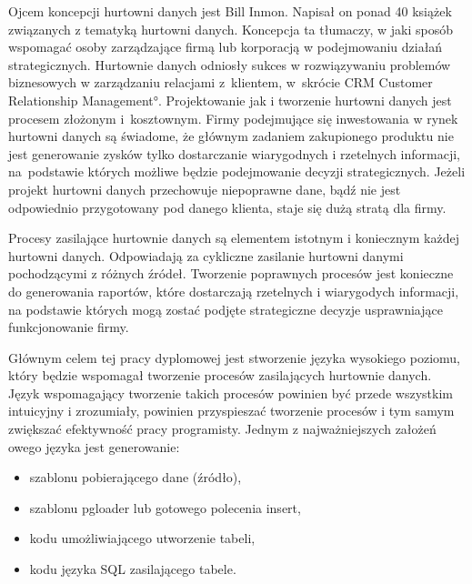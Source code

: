 Ojcem koncepcji hurtowni danych jest Bill Inmon.
Napisał on ponad 40 książek związanych z tematyką hurtowni danych.
Koncepcja ta tłumaczy,
 w jaki sposób wspomagać osoby zarządzające firmą lub korporacją w podejmowaniu działań strategicznych.
Hurtownie danych odniosły sukces w rozwiązywaniu problemów biznesowych w zarządzaniu relacjami z~klientem,
 w~skrócie CRM \ang{Customer Relationship Management}.
Projektowanie jak i tworzenie hurtowni danych jest procesem złożonym i~kosztownym.
 Firmy podejmujące się inwestowania w rynek hurtowni danych są świadome, 
 że głównym zadaniem zakupionego produktu nie jest generowanie zysków tylko dostarczanie wiarygodnych i rzetelnych informacji, 
 na~podstawie których możliwe będzie podejmowanie decyzji strategicznych.
Jeżeli projekt hurtowni danych przechowuje niepoprawne dane, 
 bądź nie jest odpowiednio przygotowany pod danego klienta,
 staje się dużą stratą dla firmy.\cite{TodMan}

Procesy zasilające hurtownie danych są elementem istotnym i koniecznym każdej hurtowni danych.
Odpowiadają za cykliczne zasilanie hurtowni danymi pochodzącymi z różnych źródeł. 
Tworzenie poprawnych procesów jest konieczne do generowania raportów,
 które dostarczają rzetelnych i wiarygodych informacji,
 na podstawie których mogą zostać podjęte strategiczne decyzje usprawniające funkcjonowanie firmy.

Głównym celem tej pracy dyplomowej jest stworzenie języka wysokiego poziomu,
który będzie wspomagał tworzenie procesów zasilających hurtownie danych. 
Język wspomagający tworzenie takich procesów powinien być 
 przede wszystkim intuicyjny i zrozumiały,
 powinien przyspieszać tworzenie procesów i tym samym zwiększać 
 efektywność pracy programisty.
Jednym z najważniejszych założeń owego języka jest generowanie:
\begin{itemize}
 \item szablonu pobierającego dane (źródło),
 \item szablonu pgloader lub gotowego polecenia insert,
 \item kodu umożliwiającego utworzenie tabeli,
 \item kodu języka SQL zasilającego tabele.
\end{itemize}

